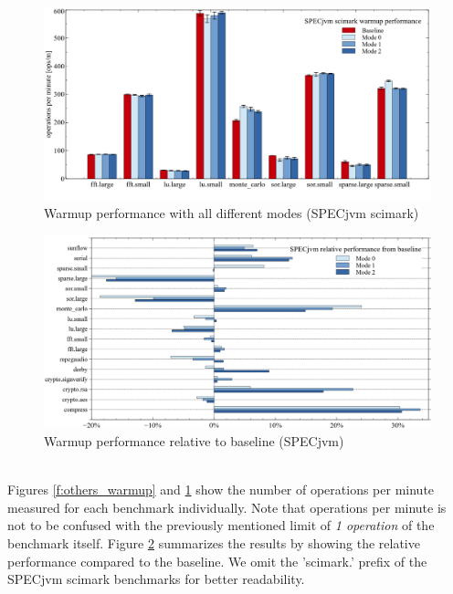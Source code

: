 \begin{figure}[ht!]
  \begin{center}
    \centering
    \includegraphics[width=1.0\textwidth]{figures/scimark_warmup.png}
    \caption{Warmup performance with all different modes (SPECjvm scimark)}
    \label{f:scimark_warmup}
  \end{center}
\end{figure}
\begin{figure}[ht!]
  \begin{center}
    \centering
    \includegraphics[width=1.0\textwidth]{figures/all_warmup_variation.png}
    \caption{Warmup performance relative to baseline (SPECjvm)}
    \label{f:all_warmup_variation}
  \end{center}
\end{figure}
\\
Figures \ref{f:others_warmup} and \ref{f:scimark_warmup} show the number of operations per minute measured for each benchmark individually. Note that operations per minute is not to be confused with the previously mentioned limit of \textit{1 operation} of the benchmark itself.
Figure \ref{f:all_warmup_variation} summarizes the results by showing the relative performance compared to the baseline. We omit the 'scimark.' prefix of the SPECjvm scimark benchmarks for better readability.
